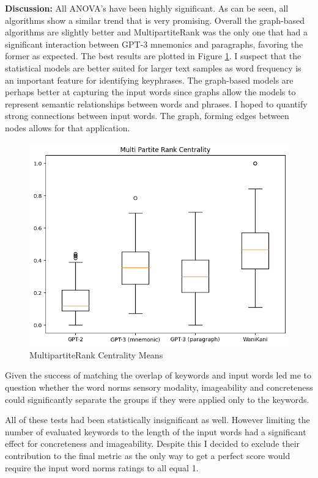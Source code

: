 \textbf{Discussion:} All ANOVA's have been highly significant. As can be seen, all algorithms show a similar trend that is very promising. Overall the graph-based algorithms are slightly better and MultipartiteRank was the only one that had a significant interaction between GPT-3 mnemonics and paragraphs, favoring the former as expected. The best results are plotted in Figure \ref{figure:mpr_centrality}. I suspect that the statistical models are better suited for larger text samples as word frequency is an important feature for identifying keyphrases. The graph-based models are perhaps better at capturing the input words since graphs allow the models to represent semantic relationships between words and phrases. I hoped to quantify strong connections between input words. The graph, forming edges between nodes allows for that application.
\begin{figure}
    \centering
    \includegraphics[width=400pt]{resources/mpr_centrality.png}
    \caption{MultipartiteRank Centrality Means}
    \label{figure:mpr_centrality}
\end{figure}

Given the success of matching the overlap of keywords and input words led me to question whether the word norms sensory modality, imageability and concreteness could significantly separate the groups if they were applied only to the keywords.

All of these tests had been statistically insignificant as well. However limiting the number of evaluated keywords to the length of the input words had a significant effect for concreteness and imageability. Despite this I decided to exclude their contribution to the final metric as the only way to get a perfect score would require the input word norms ratings to all equal 1.

